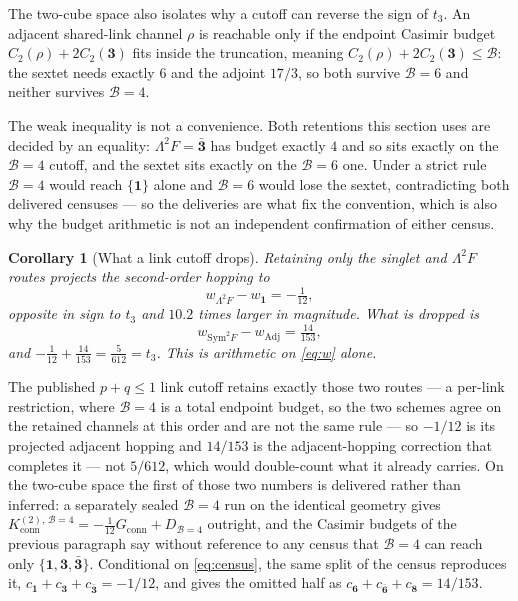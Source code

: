 \documentclass[11pt]{article}
\theoremstyle{plain}
\newtheorem{corollary}[theorem]{Corollary}
\theoremstyle{definition}
\theoremstyle{remark}
\newcommand{\chk}[1]{}
\begin{document}
The two-cube space also isolates why a cutoff can reverse the sign of $t_3$.
An adjacent shared-link channel $\rho$ is reachable only if the endpoint
Casimir budget $C_2(\rho)+2C_2(\mathbf 3)$ fits inside the truncation, meaning
$C_2(\rho)+2C_2(\mathbf 3)\le\mathcal B$: the sextet needs exactly $6$ and the
adjoint $17/3$, so both survive $\mathcal B=6$ and neither survives
$\mathcal B=4$.

The weak inequality is not a convenience. Both retentions this section uses
are decided by an equality: $\Lambda^2F=\bar{\mathbf3}$ has budget exactly $4$
and so sits exactly on the $\mathcal B=4$ cutoff, and the sextet sits exactly
on the $\mathcal B=6$ one. Under a strict rule $\mathcal B=4$ would reach
$\{\mathbf 1\}$ alone and $\mathcal B=6$ would lose the sextet, contradicting
both delivered censuses --- so the deliveries are what fix the convention,
which is also why the budget arithmetic is not an independent confirmation of
either census.
\chk{B=6 retains every adjacent shared-link channel; B=4 provably cannot}
\chk{the retention rule is C2(rho) + 2 C2(3) <= B, and both retentions it decides are equalities}

\begin{corollary}[What a link cutoff drops]\label{cor:cutoff}
Retaining only the singlet and $\Lambda^2F$ routes projects the second-order
hopping to
\[
  w_{\Lambda^2F}-w_{\mathbf 1}=-\tfrac1{12},
\]
opposite in sign to $t_3$ and $10.2$ times larger in magnitude. What is
dropped is
\[
  w_{\mathrm{Sym}^2F}-w_{\mathrm{Adj}}=\tfrac{14}{153},
\]
and $-\tfrac1{12}+\tfrac{14}{153}=\tfrac5{612}=t_3$. This is arithmetic on
\eqref{eq:w} alone.
\end{corollary}

\noindent The published $p+q\le1$ link cutoff retains exactly those two
routes --- a per-link restriction, where $\mathcal B=4$ is a total endpoint
budget, so the two schemes agree on the retained channels at this order and are
not the same rule --- so $-1/12$ is its projected adjacent hopping and
$14/153$ is the adjacent-hopping correction that completes it --- not
$5/612$, which would double-count what it already carries. On the two-cube
space the first of those two numbers is delivered rather than inferred: a
separately sealed $\mathcal B=4$ run on the identical geometry gives
$K^{(2),\,\mathcal B=4}_{\mathrm{conn}}=-\tfrac1{12}G_{\mathrm{conn}}+D_{\mathcal B=4}$
outright, and the Casimir budgets of the previous paragraph say without
reference to any census that $\mathcal B=4$ can reach only
$\{\mathbf1,\mathbf3,\bar{\mathbf3}\}$. Conditional on \eqref{eq:census}, the
same split of the census reproduces it,
$c_{\mathbf 1}+c_{\mathbf 3}+c_{\bar{\mathbf 3}}=-1/12$, and gives the omitted
half as $c_{\mathbf 6}+c_{\bar{\mathbf 6}}+c_{\mathbf 8}=14/153$.
\chk{the B=6 six-channel census IS the Weingarten four-channel ledger, channel by channel}
\chk{FINDING: the T1 link cutoff reverses the sign of t\_3, and 14/153 is what it omits}
\end{document}

